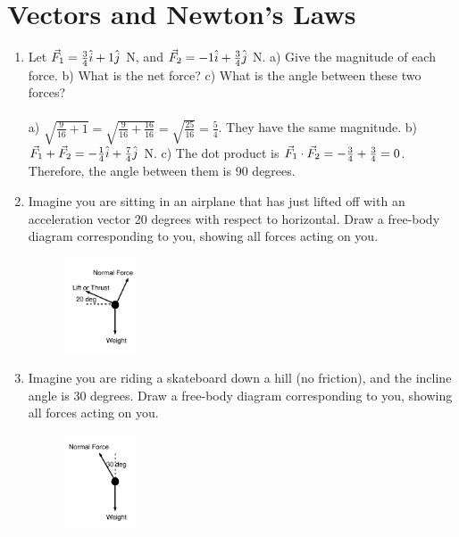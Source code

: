 \documentclass[10pt]{article}
\begin{document}
\maketitle

\section{Vectors and Newton's Laws}
\begin{enumerate}
\item Let $\vec{F}_{\rm 1} = \frac{3}{4}\hat{i} + 1\hat{j}$ N, and $\vec{F}_{\rm 2} = -1\hat{i} + \frac{3}{4}\hat{j}$ N.  a) Give the magnitude of each force.  b) What is the net force?  c) What is the angle between these two forces? \\ \\
a) $\sqrt{\frac{9}{16} + 1} = \sqrt{\frac{9}{16}+\frac{16}{16}} = \sqrt{\frac{25}{16}} = \frac{5}{4}$.  They have the same magnitude.  b) $\vec{F}_{\rm 1} + \vec{F}_{\rm 2} = -\frac{1}{4}\hat{i} + \frac{7}{4}\hat{j}$ N. c) The dot product is $\vec{F}_{\rm 1} \cdot \vec{F}_{\rm 2} = -\frac{3}{4}+\frac{3}{4} = 0$.  Therefore, the angle between them is 90 degrees.
\item Imagine you are sitting in an airplane that has just lifted off with an acceleration vector 20 degrees with respect to horizontal.  Draw a free-body diagram corresponding to you, showing all forces acting on you.
\begin{figure}[ht]
\centering
\includegraphics[width=0.2\textwidth]{figures/FBD1.pdf}
\end{figure}
\item Imagine you are riding a skateboard down a hill (no friction), and the incline angle is 30 degrees.  Draw a free-body diagram corresponding to you, showing all forces acting on you.
\begin{figure}[ht]
\centering
\includegraphics[width=0.2\textwidth]{figures/FBD2.pdf}
\end{figure}
\end{enumerate}
\end{document}
